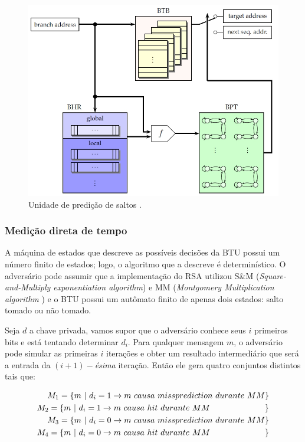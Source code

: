 \begin{figure}[ht]
	\centering
	\includegraphics[width=.5\textwidth]{figures/btu.jpg}
	\caption{Unidade de predi\c{c}\~{a}o de saltos \cite{Jean-Pierre06predictingsecret}.}
	\label{fig:Fig_btu}
\end{figure}

\subsubsection*{Medi\c{c}\~{a}o direta de tempo}

A m\'{a}quina de estados que descreve as poss\'{i}veis decis\~{o}es da BTU possui um n\'{u}mero finito de estados; logo, o algoritmo que a descreve \'{e} determin\'{i}stico. O advers\'{a}rio pode assumir que a implementa\c{c}\~{a}o do RSA utilizou S\&M (\textit{Square-and-Multiply exponentiation algorithm}) e MM (\textit{Montgomery Multiplication algorithm} \cite{ECCBook_HankersonVanstone2004, 1197338}) e o BTU possui um aut\^{o}mato finito de apenas dois estados: salto tomado ou n\~{a}o tomado.

Seja $d$ a chave privada, vamos supor que o advers\'{a}rio conhece seus $i$ primeiros bits e est\'{a} tentando determinar $d_{i}$. Para qualquer mensagem $m$, o advers\'{a}rio pode simular as primeiras $i$ itera\c{c}\~{o}es e obter um resultado intermedi\'{a}rio que ser\'{a} a entrada da $(i+1)-$\textit{\'{e}sima} itera\c{c}\~{a}o. Ent\~{a}o ele gera quatro conjuntos distintos tais que:

\begin{align} \notag
	M_{1} = \left\lbrace m\ \vert\ d_{i} = 1 \rightarrow m\ causa\ missprediction\ durante\ MM\right\rbrace \\ \notag
	M_{2} = \left\lbrace m\ \vert\ d_{i} = 1 \rightarrow m\ causa\ hit\ durante\ MM\ \ \ \ \ \ \ \ \ \ \ \ \ \ \ \ \ \ \ \ \right\rbrace \\ \notag
	M_{3} = \left\lbrace m\ \vert\ d_{i} = 0 \rightarrow m\ causa\ missprediction\ durante\ MM\right\rbrace \\ \notag
	M_{4} = \left\lbrace m\ \vert\ d_{i} = 0 \rightarrow m\ causa\ hit\ durante\ MM\ \ \ \ \ \ \ \ \ \ \ \ \ \ \ \ \ \ \ \ \right\rbrace \\ \notag
\end{align}

